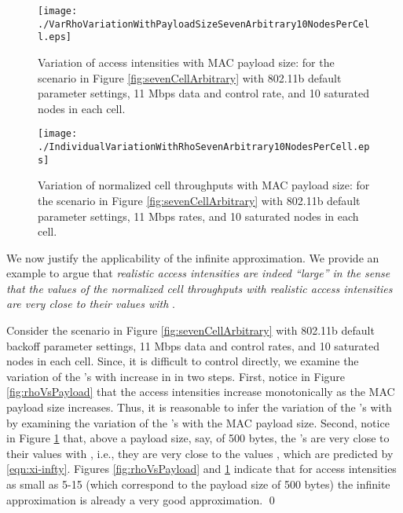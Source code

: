 \documentclass[10pt,a4paper,journal]{IEEEtran}
\theoremstyle{definition}
\theoremstyle{remark}
\theoremstyle{plain}
\begin{document}
\begin{figure}[tb]
\centering
\begin{minipage}{8.25cm}
\begin{center}
\texttt{[image: ./VarRhoVariationWithPayloadSizeSevenArbitrary10NodesPerCell.eps]}
\caption{Variation of access intensities with MAC payload size: for the scenario in Figure \ref{fig:sevenCellArbitrary} with 802.11b default parameter settings, 11 Mbps data and control rate, and 10 saturated nodes in each cell. \label{fig:rhoVsPayload}}
\end{center}
\end{minipage}
\hfill
\begin{minipage}{8.25cm}
\begin{center}
\texttt{[image: ./IndividualVariationWithRhoSevenArbitrary10NodesPerCell.eps]}
\caption{Variation of normalized cell throughputs with MAC payload size: 
for the scenario in Figure \ref{fig:sevenCellArbitrary} with 802.11b default parameter settings, 11 Mbps rates, and 10 saturated nodes in each cell.\label{fig:xVsPayload}}
\end{center}
\end{minipage}
\end{figure}


We now justify the applicability of the infinite  approximation. We provide an example to argue that \textit{realistic access intensities are indeed ``large'' in the sense that the values of the normalized cell throughputs with realistic access intensities are very close to their values with }. 

\begin{example}
\label{ex:justifying-infinite-rho}
Consider the scenario in Figure \ref{fig:sevenCellArbitrary} with 802.11b default backoff parameter settings, 11 Mbps data and control rates, and 10 saturated nodes in each cell. Since, it is difficult to control  directly, we examine the variation of the 's with increase in  in two steps. First, notice in Figure \ref{fig:rhoVsPayload} that the access intensities increase monotonically as the MAC payload size increases. Thus, it is reasonable to infer the variation of the 's with  by examining the variation of the 's with the MAC payload size. Second, notice in Figure \ref{fig:xVsPayload} that, above a payload size, say, of 500 bytes, the 's are very close to their values with , i.e., they are very close to the values , which are predicted by \eqref{eqn:xi-infty}. Figures \ref{fig:rhoVsPayload} and \ref{fig:xVsPayload} indicate that for access intensities as small as 5-15 (which correspond to the payload size of 500 bytes) the infinite  approximation is already a very good approximation. \hfill \qed
\end{example}
\end{document}
